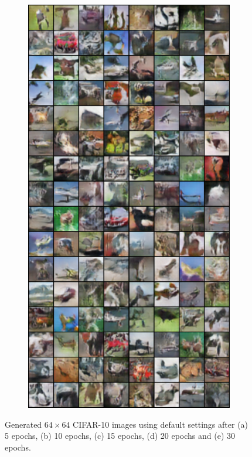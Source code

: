 \begin{figure}[H]
    \begin{subfigure}{0.2\textwidth}
        \centering
        \includegraphics[width=0.95\linewidth]{cifar10/64/fake_sample_epoch_0030.png}
        \caption{}
        \label{subfig:cifar10/64/fake_sample_epoch_0030}
    \end{subfigure}%

    \caption{Generated $64 \times 64$ CIFAR-10 images using default settings after (a) 5 epochs, (b) 10 epochs, (c) 15 epochs, (d) 20 epochs and (e) 30 epochs.}
    \label{fig:cifar10_64_images}
\end{figure}


